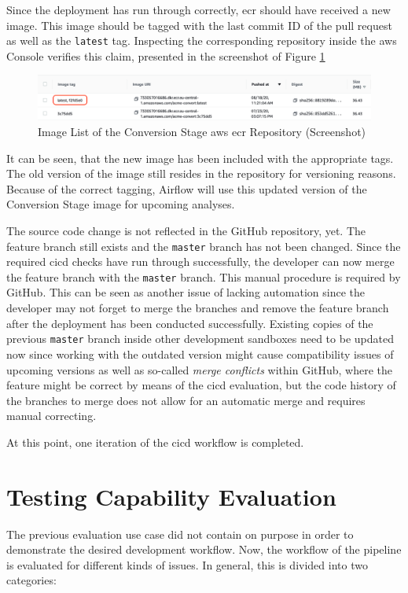 Since the deployment has run through correctly, \ac{ecr} should have received a new image. This image should be tagged with the last commit ID of the pull request as well as the \texttt{latest} tag. Inspecting the corresponding repository inside the \ac{aws} Console verifies this claim, presented in the screenshot of Figure \ref{fig:6-ecr}

\begin{figure}[h!]
	\centering
	\includegraphics[width=\linewidth]{main-matter/img/6-ecr}
	\caption{Image List of the Conversion Stage \acs{aws} \ac{ecr} Repository (Screenshot)}
	\label{fig:6-ecr}
\end{figure}

It can be seen, that the new image has been included with the appropriate tags. The old version of the image still resides in the repository for versioning reasons. Because of the correct tagging, Airflow will use this updated version of the Conversion Stage image for upcoming analyses. 

The source code change is not reflected in the GitHub repository, yet. The feature branch still exists and the \texttt{master} branch has not been changed. Since the required \ac{cicd} checks have run through successfully, the developer can now merge the feature branch with the \texttt{master} branch. This manual procedure is required by GitHub. This can be seen as another issue of lacking automation since the developer may not forget to merge the branches and remove the feature branch after the deployment has been conducted successfully. Existing copies of the previous \texttt{master} branch inside other development sandboxes need to be updated now since working with the outdated version might cause compatibility issues of upcoming versions as well as so-called \textit{merge conflicts} within GitHub, where the feature might be correct by means of the \ac{cicd} evaluation, but the code history of the branches to merge does not allow for an automatic merge and requires manual correcting.

At this point, one iteration of the \ac{cicd} workflow is completed.

\section{Testing Capability Evaluation}
The previous evaluation use case did not contain on purpose in order to demonstrate the desired development workflow. Now, the workflow of the pipeline is evaluated for different kinds of issues. In general, this is divided into two categories:

